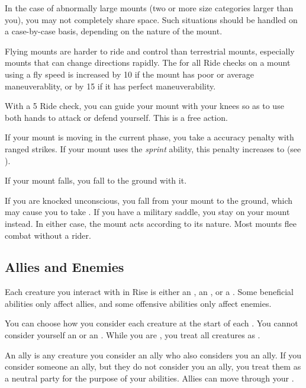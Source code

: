             In the case of abnormally large mounts (two or more size categories larger than you), you may not completely share space. Such situations should be handled on a case-by-case basis, depending on the nature of the mount.

             Flying mounts are harder to ride and control than terrestrial mounts, especially mounts that can change directions rapidly.
            The  for all Ride checks on a mount using a fly speed is increased by 10 if the mount has poor or average maneuverablity, or by 15 if it has perfect maneuverability.

             With a  5 Ride check, you can guide your mount with your knees so as to use both hands to attack or defend yourself. This is a free action.

            If your mount is moving in the current phase, you take a  accuracy penalty with ranged strikes.
            If your mount uses the \textit{sprint} ability, this penalty increases to  (see ).

             If your mount falls, you fall to the ground with it.

             If you are knocked unconscious, you fall from your mount to the ground, which may cause you to take .
            If you have a military saddle, you stay on your mount instead.
            In either case, the mount acts according to its nature.
            Most mounts flee combat without a rider.

    \subsection{Allies and Enemies}\label{Allies and Enemies}
        Each creature you interact with in Rise is either an , an , or a .
        Some beneficial abilities only affect allies, and some offensive abilities only affect enemies.

        You can choose how you consider each creature at the start of each .
        You cannot consider yourself an  or an .
        While you are \unconscious, you treat all creatures as .

         An ally is any creature you consider an ally who also considers you an ally.
        If you consider someone an ally, but they do not consider you an ally, you treat them as a neutral party for the purpose of your abilities.
        Allies can move through your .

